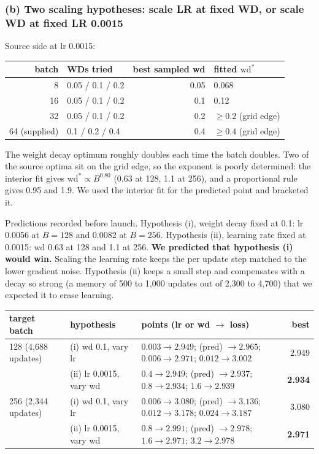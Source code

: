 \documentclass[10pt,letterpaper]{article}
\newcommand{\wds}{\ensuremath{\mathrm{wd}^{*}}}
\begin{document}
\subsubsection*{(b) Two scaling hypotheses: scale LR at fixed WD, or scale WD at fixed LR 0.0015}

Source side at lr 0.0015:

\begin{table}[H]\centering\small
\begin{tabular}{rlrl}\toprule
batch & WDs tried & best sampled wd & fitted $\wds$\\\midrule
8 & 0.05 / 0.1 / 0.2 & 0.05 & 0.068\\
16 & 0.05 / 0.1 / 0.2 & 0.1 & 0.12\\
32 & 0.05 / 0.1 / 0.2 & 0.2 & $\ge0.2$ (grid edge)\\
64 (supplied) & 0.1 / 0.2 / 0.4 & 0.4 & $\ge0.4$ (grid edge)\\\bottomrule
\end{tabular}
\end{table}

The weight decay optimum roughly doubles each time the batch doubles. Two of the source optima sit on the grid edge, so the exponent is poorly determined: the interior fit gives $\wds\propto B^{0.80}$ (0.63 at 128, 1.1 at 256), and a proportional rule gives 0.95 and 1.9. We used the interior fit for the predicted point and bracketed it.

Predictions recorded before launch. Hypothesis (i), weight decay fixed at 0.1: lr 0.0056 at $B=128$ and 0.0082 at $B=256$. Hypothesis (ii), learning rate fixed at 0.0015: wd 0.63 at 128 and 1.1 at 256. \textbf{We predicted that hypothesis (i) would win.} Scaling the learning rate keeps the per update step matched to the lower gradient noise. Hypothesis (ii) keeps a small step and compensates with a decay so strong (a memory of 500 to 1{,}000 updates out of 2{,}300 to 4{,}700) that we expected it to erase learning.

\begin{table}[H]\small
\begin{tabularx}{\textwidth}{llLr}\toprule
target batch & hypothesis & points (lr or wd $\to$ loss) & best\\ (4{,}688 updates) & (i) wd 0.1, vary lr & $0.003\to\mathbf{2.949}$; (pred) $\to2.965$;\; $0.006\to2.971$;\; $0.012\to3.002$ & 2.949\\
 & (ii) lr 0.0015, vary wd & $0.4\to2.949$; (pred) $\to2.937$;\; $0.8\to\mathbf{2.934}$;\; $1.6\to2.939$ & \textbf{2.934}\\ (2{,}344 updates) & (i) wd 0.1, vary lr & $0.006\to\mathbf{3.080}$; (pred) $\to3.136$;\; $0.012\to3.178$;\; $0.024\to3.187$ & 3.080\\
 & (ii) lr 0.0015, vary wd & $0.8\to2.991$; (pred) $\to2.978$;\; $1.6\to\mathbf{2.971}$;\; $3.2\to2.978$ & \textbf{2.971}\\\bottomrule
\end{tabularx}
\end{table}
\end{document}
